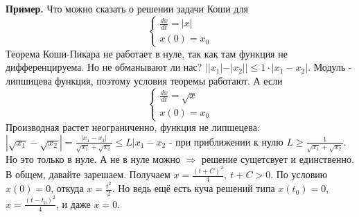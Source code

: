 \textbf{Пример.}  Что можно сказать о решении задачи Коши для
$$\begin{cases}
    \frac{dx}{dt}=|x|\\x(0)=x_0
\end{cases}$$
Теорема Коши-Пикара не работает в нуле, так как там функция не дифференцируема.
Но не обманывают ли нас?
$| |x_1|-|x_2| |\leqslant 1\cdot |x_1-x_2|$. Модуль - липшицева функция, 
поэтому условия теоремы работают. 
А если 
$$\begin{cases}
    \frac{dx}{dt}=\sqrt{x} \\x(0)=x_0
\end{cases}$$
Производная растет неограниченно, функция не липшецева: 
$|\sqrt{x_1}-\sqrt{x_2}|=\frac{|x_1-x_2|}{\sqrt{x_1}+\sqrt{x_2}}\leqslant L
|x_1-x_2$ - при приближении к нулю $L\geqslant\frac{1}{\sqrt{x_1}+\sqrt{x_2}}$.
Но это только в нуле. А не в нуле можно $\Rightarrow$ решение сущетсвует и 
единственно. В общем, давайте зарешаем. Получаем $x=\frac{(t+C)^2}{4},~t+C>0$.
По условию $x(0)=0$, откуда $x=\frac{t^2}{2}$. Но ведь ещё есть куча решений
типа $x(t_0)=0$,  $x=\frac{(t-t_0)^2}{4}$, и даже $x=0$. 




